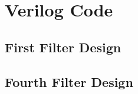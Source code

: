 \section*{Verilog Code}
\subsection*{First Filter Design}






\newpage

\subsection*{Fourth Filter Design}





